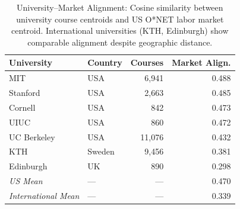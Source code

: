 \begin{table}[t]
\centering
\caption{University--Market Alignment: Cosine similarity between university course centroids and US O*NET labor market centroid. International universities (KTH, Edinburgh) show comparable alignment despite geographic distance.}
\label{tab:market-alignment}
\begin{tabular}{llrr}
\toprule
\textbf{University} & \textbf{Country} & \textbf{Courses} & \textbf{Market Align.} \\
\midrule
MIT & USA & 6,941 & 0.488 \\
Stanford & USA & 2,663 & 0.485 \\
Cornell & USA & 842 & 0.473 \\
UIUC & USA & 860 & 0.472 \\
UC Berkeley & USA & 11,076 & 0.432 \\
KTH & Sweden & 9,456 & 0.381 \\
Edinburgh & UK & 890 & 0.298 \\
\midrule
\textit{US Mean} & --- & --- & 0.470 \\
\textit{International Mean} & --- & --- & 0.339 \\
\bottomrule
\end{tabular}
\end{table}
